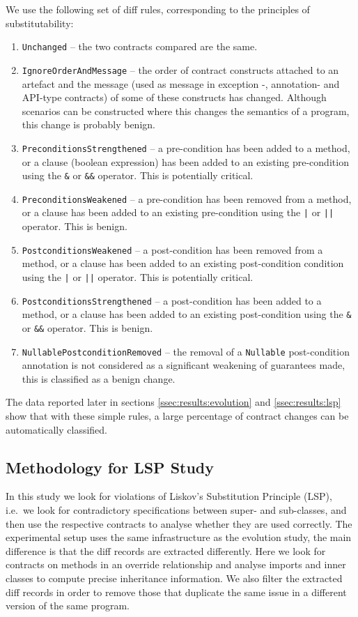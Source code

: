 \documentclass[a4paper,UKenglish]{lipics-v2016}
\begin{document}
We use the following set of diff rules, corresponding to the principles of substitutability: 
\begin{enumerate}
	\item \texttt{Unchanged} -- the two contracts compared are the same.
	\item \texttt{IgnoreOrderAndMessage} -- the order of contract constructs attached to an artefact and the message (used as message in exception -, annotation- and API-type contracts) of some of these constructs has changed. Although scenarios can be constructed where this changes the semantics of a program, this change is probably benign. 
	\item \texttt{PreconditionsStrengthened} -- a pre-condition has been added to a method, or a clause (boolean expression) has been added to an existing pre-condition using the \texttt{\&} or \texttt{\&\&} operator. This is potentially critical.
	\item \texttt{PreconditionsWeakened} -- a pre-condition has been removed from a method, or a clause has been added to an existing pre-condition using the \texttt{|} or \texttt{||} operator. This is benign.
	\item \texttt{PostconditionsWeakened} -- a post-condition has been removed from a method, or a clause has been added to an existing post-condition condition using the \texttt{|} or \texttt{||} operator. This is potentially critical.
	\item \texttt{PostconditionsStrengthened} -- a post-condition has been added to a method, or a clause has been added to an existing post-condition using the \texttt{\&} or \texttt{\&\&} operator. This is benign.
	\item \texttt{NullablePostconditionRemoved} -- the removal of a \texttt{Nullable} post-condition annotation is not considered as a significant weakening of guarantees made, this is classified as a benign change.
\end{enumerate}

The data reported later in sections \ref{ssec:results:evolution} and \ref{ssec:results:lsp} show that with these simple rules, a large percentage of contract changes can be automatically classified. 

\subsection{Methodology for LSP Study}
\label{ssec:meth:lsp}

In this study we look for violations of Liskov's Substitution Principle (LSP), i.e.\ we look for contradictory specifications between super- and sub-classes, and then use the respective contracts to analyse whether they are used correctly. The experimental setup uses the same infrastructure as the evolution study, the main difference is that the diff records are extracted differently. Here we look for contracts on methods in an override relationship and analyse imports and inner classes to compute precise inheritance information. We also filter the extracted diff records in order to remove those that duplicate the same issue in a different version of the same program.
\end{document}
